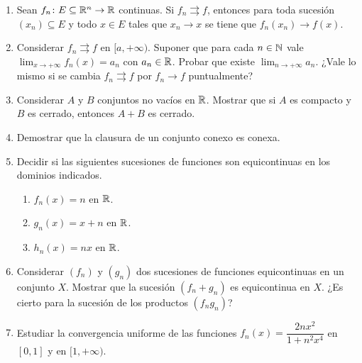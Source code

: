 \begin{enumerate}[label=(\arabic*)]
  \item Sean \(f_n\colon E \subseteq \mathbb{R}^n \to \mathbb{R}\) continuas. Si \(f_n \rightrightarrows f\), entonces para toda sucesión \({(x_n)} \subseteq E\) y todo \(x \in E\) tales que \(x_n \to x\) se tiene que \(f_n(x_n) \to f(x)\).
  \item Considerar \(f_n \rightrightarrows f\) en \([a, +\infty)\). Suponer que para cada \(n \in \mathbb{N}\) vale \(\lim_{x \to +\infty} f_n(x) = a_n\) con \(a_n \in \mathbb{R}\). Probar que existe \(\lim_{n \to +\infty} a_n\). ¿Vale lo mismo si se cambia \(f_n \rightrightarrows f\) por \(f_n \to f\) puntualmente?
  \item Considerar \(A\) y \(B\) conjuntos no vacíos en \(\mathbb{R}\). Mostrar que si \(A\) es compacto y \(B\) es cerrado, entonces \(A + B\) es cerrado.
  \item Demostrar que la clausura de un conjunto conexo es conexa.
  \item Decidir si las siguientes sucesiones de funciones son equicontinuas en los dominios indicados.
        \begin{enumerate}[label=(\alph*)]
          \item \(f_n(x) = n\) en \(\mathbb{R}\).
          \item \(g_n(x) = x + n\) en \(\mathbb{R}\).
          \item \(h_n(x) = n x\) en \(\mathbb{R}\).
        \end{enumerate}
  \item Considerar \({(f_n)}\) y \({(g_n)}\) dos sucesiones de funciones equicontinuas en un conjunto \(X\). Mostrar que la sucesión \({(f_n + g_n)}\) es equicontinua en \(X\). ¿Es cierto para la sucesión de los productos \({(f_n g_n)}\)?
  \item Estudiar la convergencia uniforme de las funciones \(f_n(x) = \dfrac{2 n x^2}{1 + n^2 x^4}\) en \([0, 1]\) y en \([1, +\infty)\).
\end{enumerate}
